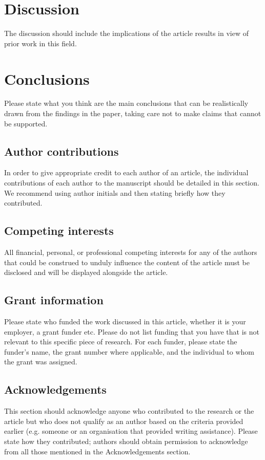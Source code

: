 \documentclass[10pt,a4paper,twocolumn]{article}
\begin{document}
\section*{Discussion}
The discussion should include the implications of the article results in view of prior work in this field.

\section*{Conclusions}
Please state what you think are the main conclusions that can be realistically drawn from the findings in the paper, taking care not to make claims that cannot be supported.



\subsection*{Author contributions}
In order to give appropriate credit to each author of an article, the individual
contributions of each author to the manuscript should be detailed in this section. We
recommend using author initials and then stating briefly how they contributed.

\subsection*{Competing interests}
All financial, personal, or professional competing interests for any of the authors that
could be construed to unduly influence the content of the article must be disclosed and
will be displayed alongside the article.

\subsection*{Grant information}
Please state who funded the work discussed in this article, whether it is your employer,
a grant funder etc. Please do not list funding that you have that is not relevant to this
specific piece of research. For each funder, please state the funder’s name, the grant
number where applicable, and the individual to whom the grant was assigned.

\subsection*{Acknowledgements}
This section should acknowledge anyone who contributed to the research or the
article but who does not qualify as an author based on the criteria provided earlier
(e.g. someone or an organisation that provided writing assistance). Please state how
they contributed; authors should obtain permission to acknowledge from all those
mentioned in the Acknowledgements section.
\end{document}
